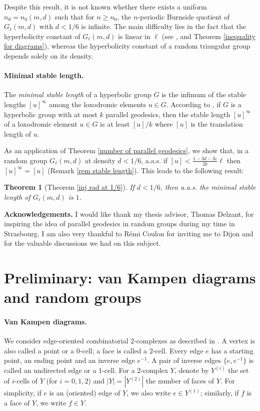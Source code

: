 \documentclass[a4paper]{article}
\newcommand{\moinsun}{^{-1}}
\newtheorem*{thm*}{Theorem}
\theoremstyle{remark}
\begin{document}
Despite this result, it is not known whether there exists a uniform $n_0 = n_0(m,d)$ such that for $n\geq n_0$, the $n$-periodic Burnside quotient of $G_\ell(m,d)$ with $d<1/6$ is infinite. The main difficulty lies in the fact that the hyperbolicity constant of $G_\ell(m,d)$ is linear in $\ell$ (see \cite{Gro93}, \cite{Oll07} and Theorem \ref{inequality for diagrams}), whereas the hyperbolicity constant of a random triangular group depends solely on its density.

\paragraph{Minimal stable length.} The \textit{minimal stable length} of a hyperbolic group $G$ is the infimum of the stable lengths $[u]^\infty$ among the loxodromic elements $u\in G$. According to \cite[Proposition 3.1]{Del96}, if $G$ is a hyperbolic group with at most $k$ parallel geodesics, then the stable length $[u]^\infty$ of a loxodromic element $u\in G$ is at least $[u]/k$ where $[u]$ is the translation length of $u$. 

As an application of Theorem \ref{number of parallel geodesics}, we show that, in a random group $G_\ell(m,d)$ at density $d<1/6$, a.a.s. if $[u] < \frac{1-3d-3\varepsilon}{2k}\ell$ then $[u]^\infty = [u]$ (Remark \ref{rem stable length}). This leads to the following result:

\begin{thm*}[Theorem \ref{inj rad at 1/6}] If $d<1/6$, then a.a.s. the minimal stable length of $G_\ell(m,d)$ is $1$.
\end{thm*}

\textbf{Acknowledgements.} I would like thank my thesis advisor, Thomas Delzant, for inspiring the idea of parallel geodesics in random groups during my time in Strasbourg. I am also very thankful to Rémi Coulon for inviting me to Dijon and for the valuable discussions we had on this subject.

\section{Preliminary: van Kampen diagrams and random groups}
\paragraph{Van Kampen diagrams.}
We consider edge-oriented combinatorial 2-complexes as described in \cite[\S III.2]{LS77}. A vertex is also called a point or a $0$-cell; a face is called a $2$-cell. Every edge $e$ has a starting point, an ending point and an inverse edge $e\moinsun$. A pair of inverse edges $\{e,e\moinsun\}$ is called an undirected edge or a $1$-cell. For a 2-complex $Y$, denote by $Y^{(i)}$ the set of $i$-cells of $Y$ (for $i=0,1,2$) and $|Y| = |Y^{(2)}|$ the number of faces of $Y$. For simplicity, if $e$ is an (oriented) edge of $Y$, we also write $e \in Y^{(1)}$; similarly, if $f$ is a face of $Y$, we write $f \in Y$.
\end{document}
